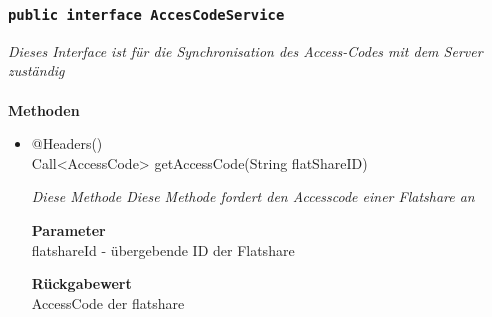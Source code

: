 \documentclass[a4paper]{scrreprt}
\begin{document}
             	\subsubsection{\texttt{public interface AccesCodeService}}
        \textit{Dieses Interface ist für die Synchronisation des Access-Codes mit dem Server zuständig }\\
        \\
		\textbf{Methoden} \\
 			\begin{itemize}
        		\item{@Headers()\\ Call<AccessCode> getAccessCode(String flatShareID)}
        	
        		\textit{Diese Methode Diese Methode fordert den Accesscode einer Flatshare an}
        	
        		\textbf{Parameter} \\
                flatshareId - übergebende ID der Flatshare
        		        	
       		 	\textbf{Rückgabewert} \\
                AccessCode der flatshare
      		  	 
      	        	
       		 \end{itemize}
             
\end{document}
